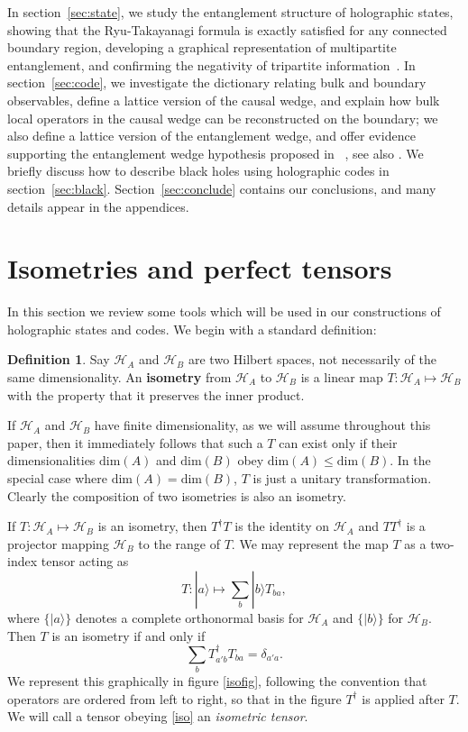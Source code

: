 \documentclass[12pt]{article}
\theoremstyle{plain}
\theoremstyle{plain}
\theoremstyle{plain}
\theoremstyle{plain}
\theoremstyle{result}
\theoremstyle{remark}
\theoremstyle{conjecture}
\theoremstyle{observation}
\theoremstyle{definition}
\theoremstyle{corollary}
\theoremstyle{definition}
\theoremstyle{definition}
\newtheorem{definition}{Definition}
\theoremstyle{assumption}
\theoremstyle{definition}
\theoremstyle{problem}
\theoremstyle{fact}
\newcommand{\be}{\begin{equation}}
\newcommand{\ee}{\end{equation}}
\newcommand{\ran}{\rangle}
\newcommand{\HA}{\mathcal{H}_A}
\newcommand{\HB}{\mathcal{H}_B}
\begin{document}
In section~\ref{sec:state}, we study the entanglement structure of holographic states, showing that the Ryu-Takayanagi formula is exactly satisfied for any connected boundary region, developing a graphical representation of multipartite entanglement, and confirming the negativity of tripartite information~\cite{Hayden13b}. In section~\ref{sec:code}, we investigate the dictionary relating bulk and boundary observables, define a lattice version of the causal wedge, and explain how bulk local operators in the causal wedge can be reconstructed on the boundary; we also define a lattice version of the entanglement wedge, and offer evidence supporting the  entanglement wedge hypothesis proposed in ~\cite{Headrick2014, Wall2012, Czech2012}, see also \cite{Jafferis2014}. We briefly discuss how to describe black holes using holographic codes in section~\ref{sec:black}. Section~\ref{sec:conclude} contains our conclusions, and many details appear in the appendices. 

\section{Isometries and perfect tensors}\label{sec:perfect}
In this section we review some tools which will be used in our constructions of holographic states and codes. 
We begin with a standard definition:
\begin{definition}
Say $\HA$ and $\HB$ are two Hilbert spaces, not necessarily of the same dimensionality.  An \textbf{isometry} from $\HA$ to $\HB$ is a linear map $T:\HA\mapsto\HB$ with the property that it preserves the inner product.
\end{definition}
If $\HA$ and $\HB$ have finite dimensionality, as we will assume throughout this paper, then it immediately follows that such a $T$ can exist only if their dimensionalities $\textrm{dim}(A)$ and $\textrm{dim}(B)$ obey $\textrm{dim}(A)\leq \textrm{dim}(B)$.  In the special case where $\textrm{dim}(A) = \textrm{dim}(B)$, $T$ is just a unitary transformation.  Clearly the composition of two isometries is also an isometry.

If $T:\HA\mapsto\HB$ is an isometry, then $T^\dagger T$ is the identity on $\HA$ and $TT^\dagger$ is a projector mapping $\HB$ to the range of $T$. We may represent the map $T$ as a two-index tensor acting as
\be
T:|a\ran \mapsto \sum_b |b\ran T_{ba},
\ee
where $\{|a\ran\}$ denotes a complete orthonormal basis for $\HA$ and $\{|b\ran\}$ for $\HB$.  Then $T$ is an isometry if and only if
\be\label{iso}
\sum_b T^{\dagger}_{a'b}T_{ba}=\delta_{a'a}.
\ee
We represent this graphically in figure \ref{isofig}, following the convention that operators are ordered from left to right, so that in the figure $T^\dagger$ is applied after $T$. We will call a tensor obeying \eqref{iso} an \textit{isometric tensor}.  
\end{document}
